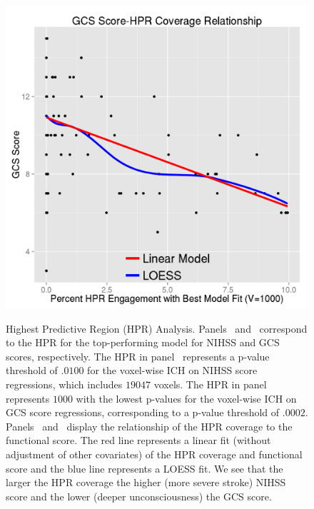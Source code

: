 \documentclass[10pt]{article}\usepackage[]{graphicx}\usepackage[]{color}
\begin{document}
\begin{figure}[H]
{ \label{pvals:reggcs}
 \includegraphics[width=.48\textwidth]{Regress_ROI_GCS_Best_Model.png}
 } 
 \newline 
  
  \caption{Highest Predictive Region (HPR) Analysis.  Panels~\protect{} and~\protect{} correspond to the HPR for the top-performing model for NIHSS and GCS scores, respectively.  The HPR in panel~\protect{} represents a p-value threshold of $.0100$ for the voxel-wise ICH on NIHSS score regressions, which includes $19047$ voxels. The HPR in panel~\protect{} represents $1000$ with the lowest p-values for the voxel-wise ICH on GCS score regressions, corresponding to a p-value threshold of $.0002$.
    Panels~\protect{} and~\protect{} display the relationship of the HPR coverage to the functional score.  The red line represents a linear fit (without adjustment of other covariates) of the HPR coverage and functional score and the blue line represents a LOESS fit.  We see that the larger the HPR coverage the higher (more severe stroke) NIHSS score and the lower (deeper unconsciousness) the GCS score.  
}
  \label{f:roi}
\end{figure}





  
\end{document}
